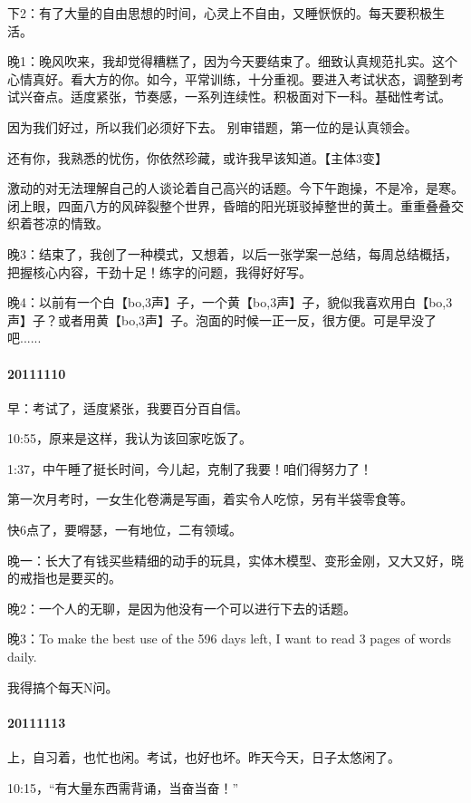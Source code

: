 \documentclass[UTF8]{book}
\begin{document}
下2：有了大量的自由思想的时间，心灵上不自由，又睡恹恹的。每天要积极生活。

晚1：晚风吹来，我却觉得糟糕了，因为今天要结束了。细致认真规范扎实。这个心情真好。看大方的你。如今，平常训练，十分重视。要进入考试状态，调整到考试兴奋点。适度紧张，节奏感，一系列连续性。积极面对下一科。基础性考试。

因为我们好过，所以我们必须好下去。
别审错题，第一位的是认真领会。

还有你，我熟悉的忧伤，你依然珍藏，或许我早该知道。【主体3变】

激动的对无法理解自己的人谈论着自己高兴的话题。今下午跑操，不是冷，是寒。闭上眼，四面八方的风碎裂整个世界，昏暗的阳光斑驳掉整世的黄土。重重叠叠交织着苍凉的情致。

晚3：结束了，我创了一种模式，又想着，以后一张学案一总结，每周总结概括，把握核心内容，干劲十足！练字的问题，我得好好写。

晚4：以前有一个白【bo,3声】子，一个黄【bo,3声】子，貌似我喜欢用白【bo,3声】子？或者用黄【bo,3声】子。泡面的时候一正一反，很方便。可是早没了吧......


\paragraph{20111110}

早：考试了，适度紧张，我要百分百自信。

10:55，原来是这样，我认为该回家吃饭了。

1:37，中午睡了挺长时间，今儿起，克制了我要！咱们得努力了！

第一次月考时，一女生化卷满是写画，着实令人吃惊，另有半袋零食等。

快6点了，要嘚瑟，一有地位，二有领域。

晚一：长大了有钱买些精细的动手的玩具，实体木模型、变形金刚，又大又好，晓的戒指也是要买的。

晚2：一个人的无聊，是因为他没有一个可以进行下去的话题。

晚3：To make the best use of the 596 days left, I want to read 3 pages of words daily.

我得搞个每天N问。


\paragraph{20111113}

上，自习着，也忙也闲。考试，也好也坏。昨天今天，日子太悠闲了。

10:15，“有大量东西需背诵，当奋当奋！”
\end{document}

